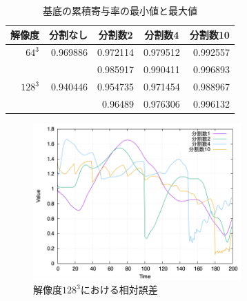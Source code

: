 \documentclass[uplatex,dvipdfmx,10pt,a4paper,notitlepage,oneside,twocolumn]{abst_jsarticle}
\begin{document}
\begin {table}[htbp]
    \centering
  \caption{基底の累積寄与率の最小値と最大値}
  \label{tab:ruiseki}
  \begin {tabular}{rrrrr} \hline
    \multicolumn{1}{c}{解像度} 					&\multicolumn{1}{c}{分割なし} 		&\multicolumn{1}{c}{分割数2}			&\multicolumn{1}{c}{分割数4} 		&\multicolumn{1}{c}{分割数10}\\ \hline
    $64^3$ 									& 0.969886					& 0.972114						&0.979512	 				&0.992557				\\
    										&							&0.985917						&0.990411					&0.996893				\\ \hline
    $128^3$ 								&0.940446 					&0.954735						&0.971454	 				&0.988967				\\ 
    										&							&0.96489							&0.976306					&0.996132				\\	\hline
  \end {tabular}
\end {table}
\begin{figure}[htbp]
\centering
\includegraphics[width=80mm]{images/128error_obstacle.png}
\caption{$解像度128^3における相対誤差$}
\label{fig:128error}
\end{figure}
\end{document}
